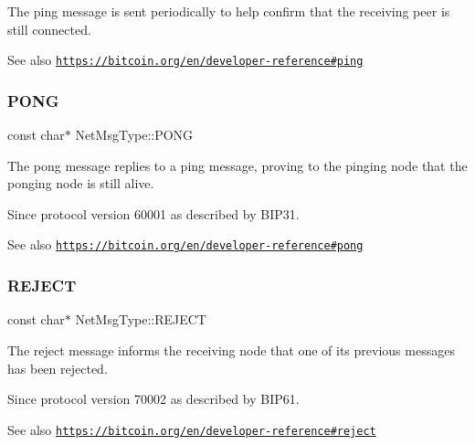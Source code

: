 The ping message is sent periodically to help confirm that the receiving peer is still connected. \begin{DoxySeeAlso}{See also}
\href{https://bitcoin.org/en/developer-reference#ping}{\tt https\+://bitcoin.\+org/en/developer-\/reference\#ping} 
\end{DoxySeeAlso}
\mbox{\label{namespace_net_msg_type_a0ab71853d397a97e7fb309fd1f718e71}} 
\subsubsection{\texorpdfstring{P\+O\+NG}{PONG}}
{\footnotesize\ttfamily const char$\ast$ Net\+Msg\+Type\+::\+P\+O\+NG}

The pong message replies to a ping message, proving to the pinging node that the ponging node is still alive. \begin{DoxySince}{Since}
protocol version 60001 as described by B\+I\+P31. 
\end{DoxySince}
\begin{DoxySeeAlso}{See also}
\href{https://bitcoin.org/en/developer-reference#pong}{\tt https\+://bitcoin.\+org/en/developer-\/reference\#pong} 
\end{DoxySeeAlso}
\mbox{\label{namespace_net_msg_type_a409e4765ed30b351d8dd6229f6cb7aae}} 
\subsubsection{\texorpdfstring{R\+E\+J\+E\+CT}{REJECT}}
{\footnotesize\ttfamily const char$\ast$ Net\+Msg\+Type\+::\+R\+E\+J\+E\+CT}

The reject message informs the receiving node that one of its previous messages has been rejected. \begin{DoxySince}{Since}
protocol version 70002 as described by B\+I\+P61. 
\end{DoxySince}
\begin{DoxySeeAlso}{See also}
\href{https://bitcoin.org/en/developer-reference#reject}{\tt https\+://bitcoin.\+org/en/developer-\/reference\#reject} 
\end{DoxySeeAlso}
\mbox{\label{namespace_net_msg_type_a6d23d2360224f28cd3211a551ea2ca3b}} 
